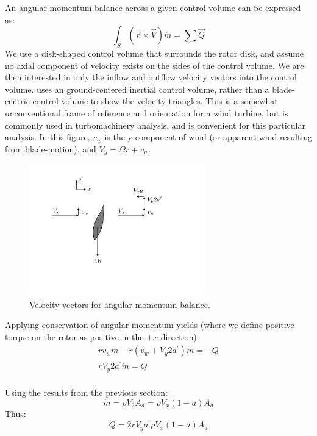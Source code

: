 \documentclass{article}
\begin{document}
An angular momentum balance across a given control volume can be expressed as:
\begin{equation}
    \int_S \left(\vec{r} \times \vec{V}\right) \dot{m} = \sum \vec{Q}
\end{equation}
We use a disk-shaped control volume that surrounds the rotor disk, and assume no axial component of velocity exists on the sides of the control volume.  We are then interested in only the inflow and outflow velocity vectors into the control volume.  uses an ground-centered inertial control volume, rather than a blade-centric control volume to show the velocity triangles.  This is a somewhat unconventional frame of reference and orientation for a wind turbine, but is commonly used in turbomachinery analysis, and is convenient for this particular analysis.  In this figure, $v_w$ is the y-component of wind (or apparent wind resulting from blade-motion), and $V_y = \Omega r + v_w$.
\begin{figure}[htbp]
\centering
\includegraphics[width=3.0in]{figures/wtvt}
\caption{Velocity vectors for angular momentum balance.}
\label{fig:wtvt}
\end{figure}


Applying conservation of angular momentum yields (where we define positive torque on the rotor as positive in the $+x$ direction):
\begin{equation}
    \begin{aligned}
        r v_w \dot{m} - r (v_w + V_y 2 a^\prime) \dot{m} = -Q\\
         r V_y 2 a^\prime \dot{m} = Q\\
    \end{aligned}
    \label{eq:momQ}
\end{equation}

Using the results from the previous section:
\begin{equation}
    \dot{m} = \rho V_2 A_d = \rho V_x(1-a) A_d
    \label{eq:mdot}
\end{equation}
Thus:
\begin{equation}
    Q = 2 r V_y a^\prime \rho V_x(1-a) A_d
\end{equation}
\end{document}
